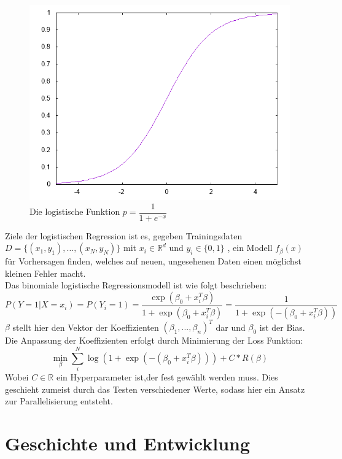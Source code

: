 \begin{figure}[ht]
\centering
\includegraphics[scale=0.70]{bilder/logistic_reg_func}
\caption{Die logistische Funktion $p=\dfrac{1}{1+e^{-x}}$ }
\end{figure}
Ziele der logistischen Regression ist es, gegeben Trainingsdaten 
$D = \{(x_1, y_1), \dots, (x_N,y_N)\}$ mit $x_i \in \mathbb R^d$ und $y_i \in 
\{0,1\}$ , ein Modell $f_{\beta}(x)$ für Vorhersagen finden, 
welches auf neuen, ungesehenen Daten einen möglichst kleinen Fehler macht.
\\
Das binomiale logistische Regressionsmodell ist wie folgt beschrieben:
\begin{displaymath}
P(Y=1 | X=x_i)=P(Y_i=1)=\frac{\exp(\beta_0+x_i^T\beta)}{1+\exp(\beta_0+x_i^T\beta)} = \frac{1}{1+\exp(-(\beta_0+x_i^T\beta))}
\end{displaymath}
$\beta$ stellt hier den Vektor der Koeffizienten $(\beta_1 ,..., \beta_n)^T$ dar und $\beta_0$ ist der Bias. \\
Die Anpassung der Koeffizienten erfolgt durch Minimierung der Loss Funktion: \begin{displaymath}
\min_\beta \sum_{i}^N \log(1+\exp(-(\beta_0+x_i^T\beta))) +C*R(\beta)
\end{displaymath}
Wobei $C \in \mathbb R$ ein Hyperparameter ist,der fest gewählt werden muss. Dies geschieht zumeist durch das Testen verschiedener Werte, sodass hier ein Ansatz zur Parallelisierung entsteht.
\section{Geschichte und Entwicklung}
